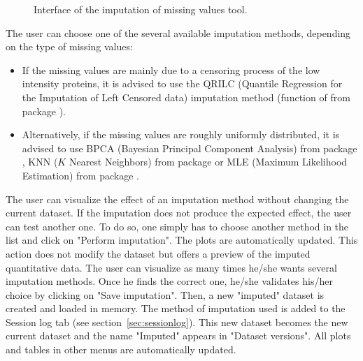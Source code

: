 \documentclass[12pt]{article}
\begin{document}
\begin {figure}
\centering
{}
\caption{Interface of the imputation of missing values tool.}\label{fig:impu}
\end {figure}


The user can choose one of the several available imputation methods, depending on the type of missing values:
\begin{itemize}
  \item If the missing values are mainly due to a censoring process of the low intensity proteins, it is advised to use the QRILC (Quantile Regression for the Imputation of Left Censored data) imputation method (function  of from package ).
  \item Alternatively, if the missing values are roughly uniformly distributed, it is advised to use BPCA (Bayesian Principal Component Analysis) from package , KNN ($K$ Nearest Neighbors) from package  or MLE (Maximum Likelihood Estimation) from package .
\end{itemize}

The user can visualize the effect of an imputation method without changing the current dataset. If the imputation does not produce the expected effect, the user can test another one. To do so, one simply has to choose another method in the list and click on "Perform imputation". The plots are automatically updated. This action does not modify the dataset but offers a preview of the imputed quantitative data.
The user can visualize as many times he/she wants several imputation methods. Once he finds the correct one, he/she validates his/her choice by clicking on "Save imputation". Then, a new "imputed" dataset is created and loaded in memory. The method of imputation used is added to the Session log tab (see section~\ref{sec:sessionlog}). This new dataset becomes the new current dataset and the name "Imputed" appears in "Dataset versions". All plots and tables in other menus are automatically updated.
\end{document}
